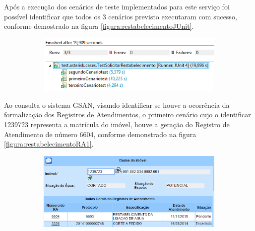  Após a execução dos cenários de teste implementados para este serviço foi possível identificar que todos os 3 cenários previsto executaram com sucesso, conforme demostrado na figura \ref{figura:restabelecimentoJUnit}.	

\begin{figure}[H]
	\centering
	\caption{\textbf{Restabelecimento da Ligação de Água - Detalhes execução dos testes}}
	\label{figura:restabelecimentoJUnit}
	\begin{subfigure}[H]{\textwidth}
		\centering
		\includegraphics{figuras/cenarios/restabelecimento/junit_result.PNG}
	\end{subfigure}
\end{figure}

Ao consulta o sistema GSAN, visando identificar se houve a ocorrência da formalização dos Registros de Atendimentos, o primeiro cenário cujo o identificar 1239723 representa a matrícula do imóvel, houve a geração do Registro de Atendimento de número 6604, conforme demonstrado na figura \ref{figura:restabelecimentoRA1}.

\begin{figure}[H]
	\centering
	\caption{\textbf{Restabelecimento da Ligação de Água - RA gerado para o Cenário 1}}
	\label{figura:restabelecimentoRA1}
	\begin{subfigure}[H]{\textwidth}
		\centering
		\includegraphics{figuras/cenarios/restabelecimento/resultado_1.PNG}
	\end{subfigure}
\end{figure}


